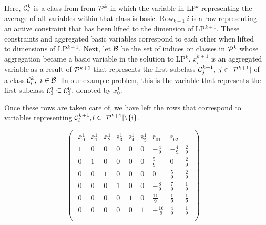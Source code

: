 \documentclass[11pt]{article} %
\newcommand{\cP}{{\cal P}}
\newcommand{\cC}{{\cal C}}
\newcommand{\cB}{{\cal B}}
\begin{document}
	Here, $\cC_i^{k}$ is a class from from $\cP^k$ in which the variable in LP$^k$ representing the average of all variables within that class is basic.  Row$_{k + 1} \ i$ is a row representing an active constraint that has been lifted to the dimension of LP$^{k + 1}$.  These constraints and aggregated basic variables correspond to each other when lifted to dimensions of LP$^{k + 1}$.  Next, let $\cB$ be the set of indices on classes in $\cP^k$ whose aggregation became a basic variable in the solution to LP$^k$.  $\bar{x}_i^{k + 1}$ is an aggregated variable as a result of $\cP^{k + 1}$ that represents the first subclass $\cC_j^{k + 1}, \ j \in |\cP^{k + 1}|$ of a class $\cC_i^k , \ i \in \cB$.  In our example problem, this is the variable that represents the first subclass $\cC_0^1 \subseteq \cC_0^0$, denoted by $\bar{x}_0^1$.
	
	Once these rows are taken care of, we have left the rows that correspond to variables representing $\cC_l^{k + 1}, l \in |\cP^{k + 1}| \backslash \{i\}$.  
	
	\begin{equation}
	\begin{pmatrix}
	\begin{array}{cccccc|cc|c}
	\bar{x}^1_0 & \bar{x}^1_1 & \bar{x}^1_2 & \bar{s}^1_3 & \bar{s}^1_4 & \bar{s}^1_5 & \bar{r}_{01} & \bar{r}_{02} \\
	\hline
	1 & 0 & 0 & 0 & 0 & 0 & -\frac{4}{9} & -\frac{4}{9} & \frac{2}{9} \\ 
	0 & 1 & 0 & 0 & 0 & 0 & \frac{5}{9} & 0 & \frac{2}{9} \\ 
	0 & 0 & 1 & 0 & 0 & 0 & 0 & \frac{5}{9} & \frac{2}{9} \\ 
	0 & 0 & 0 & 1 & 0 & 0 & -\frac{8}{9} & \frac{7}{9} & \frac{1}{9} \\ 
	0 & 0 & 0 & 0 & 1 & 0 & \frac{11}{9} & \frac{1}{9} & \frac{1}{9} \\
	0 & 0 & 0 & 0 & 0 & 1 & -\frac{16}{9} & \frac{4}{9} & \frac{1}{9} \\
	\end{array}
	\end{pmatrix}
	\end{equation}

	
 
\end{document}
